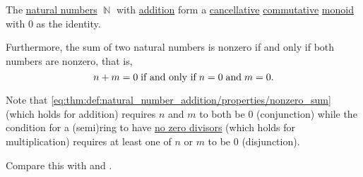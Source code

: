 \begin{proposition}\label{thm:def:natural_number_addition/properties}
  The \hyperref[def:set_of_natural_numbers]{natural numbers} \( \BbbN \) with \hyperref[def:peano_arithmetic/plus]{addition} form a \hyperref[def:magma/cancellative]{cancellative} \hyperref[def:magma/commutative]{commutative} \hyperref[def:unital_magma/associative]{monoid} with \( 0 \) as the identity.

  Furthermore, the sum of two natural numbers is nonzero if and only if both numbers are nonzero, that is,
  \begin{equation}\label{eq:thm:def:natural_number_addition/properties/nonzero_sum}
    n + m = 0 \T{if and only if} n = 0 \T{and} m = 0.
  \end{equation}

  Note that \eqref{eq:thm:def:natural_number_addition/properties/nonzero_sum} (which holds for addition) requires \( n \) and \( m \) to both be \( 0 \) (conjunction) while the condition for a (semi)ring to have \hyperref[def:semiring/no_zero_divisor]{no zero divisors} (which holds for multiplication) requires at least one of \( n \) or \( m \) to be \( 0 \) (disjunction).

  Compare this with  and .
\end{proposition}
